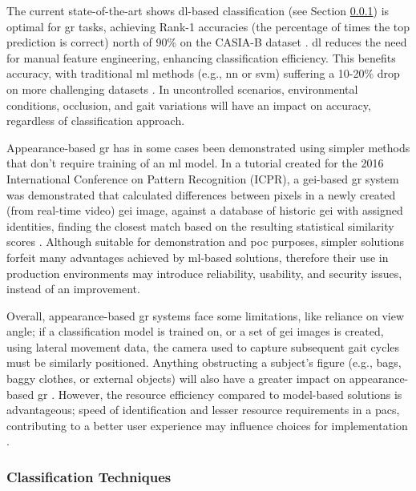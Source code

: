 The current state-of-the-art shows \ac{dl}-based classification (see Section \ref{subsubsec:classification-techniques}) is optimal for \ac{gr} tasks, achieving Rank-1 accuracies (the percentage of times the top prediction is correct) north of 90\% on the CASIA-B dataset \parencite{gunersahanSurveyAppearancebasedApproaches2024}.
\ac{dl} reduces the need for manual feature engineering, enhancing classification efficiency.
This benefits accuracy, with traditional \ac{ml} methods (e.g., \ac{nn} or \ac{svm}) suffering a 10-20\% drop on more challenging datasets \parencite{shenComprehensiveSurveyDeep2023}.
In uncontrolled scenarios, environmental conditions, occlusion, and gait variations will have an impact on accuracy, regardless of classification approach.

Appearance-based \ac{gr} has in some cases been demonstrated using simpler methods that don't require training of an \ac{ml} model.
In a tutorial created for the 2016 International Conference on Pattern Recognition (ICPR), a \ac{gei}-based \ac{gr} system was demonstrated that calculated differences between pixels in a newly created (from real-time video) \ac{gei} image, against a database of historic \acs{gei} with assigned identities, finding the closest match based on the resulting statistical similarity scores \parencite{songDevelopfengGaitRecognition2024}.
Although suitable for demonstration and \ac{poc} purposes, simpler solutions forfeit many advantages achieved by \ac{ml}-based solutions, therefore their use in production environments may introduce reliability, usability, and security issues, instead of an improvement.

Overall, appearance-based \ac{gr} systems face some limitations, like reliance on view angle; if a classification model is trained on, or a set of \ac{gei} images is created, using lateral movement data, the camera used to capture subsequent gait cycles must be similarly positioned.
Anything obstructing a subject's figure (e.g., bags, baggy clothes, or external objects) will also have a greater impact on appearance-based \ac{gr} \parencite{hanIndividualRecognitionUsing2006}.
However, the resource efficiency compared to model-based solutions is advantageous; speed of identification and lesser resource requirements in a \ac{pacs}, contributing to a better user experience may influence choices for implementation \parencite{lingShapeClassificationUsing2007}.

\subsubsection{Classification Techniques}
\label{subsubsec:classification-techniques}

